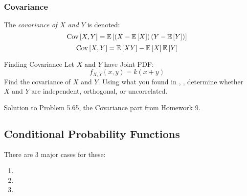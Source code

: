 \subsubsection{Covariance}\label{subsubsec:Covariance}
\begin{definition}[Covariance]\label{def:Covariance}
  The \emph{covariance of $X$ and $Y$} is denoted:
  \begin{equation}\label{eq:Covariance-Form 1}
    \text{Cov} \left[ X,Y \right] = \operatorname{\operatorname{\mathbb{E}}} \left[ \left( X - \operatorname{\operatorname{\mathbb{E}}} \left[ X \right] \right) \left( Y - \operatorname{\operatorname{\mathbb{E}}} \left[ Y \right] \right)\right]
  \end{equation}
  \begin{equation}\label{eq:Covariance-Form 2}
    \text{Cov} \left[ X,Y \right] = \operatorname{\operatorname{\mathbb{E}}} \left[ XY \right] - \operatorname{\operatorname{\mathbb{E}}} \left[ X \right] \operatorname{\operatorname{\mathbb{E}}} \left[ Y \right]
  \end{equation}
\end{definition}
\begin{example}[Problem 5.65]{Finding Covariance}
  Let $X$ and $Y$ have Joint PDF:
  \begin{equation*}
    f_{X,Y} \left( x,y \right) = k \left( x+y \right)
  \end{equation*}
  Find the covariance of $X$ and $Y$.
  Using what you found in , , determine whether $X$ and $Y$ are independent, orthogonal, or uncorrelated.

  \tcblower
  Solution to Problem 5.65, the Covariance part from Homework 9.
\end{example}

\subsection{Conditional Probability Functions}\label{subsec:Multiple Variable Conditional Probability Functions}
There are 3 major cases for these:
\begin{enumerate}
\item {}
\item {}
\item {}
\end{enumerate}

